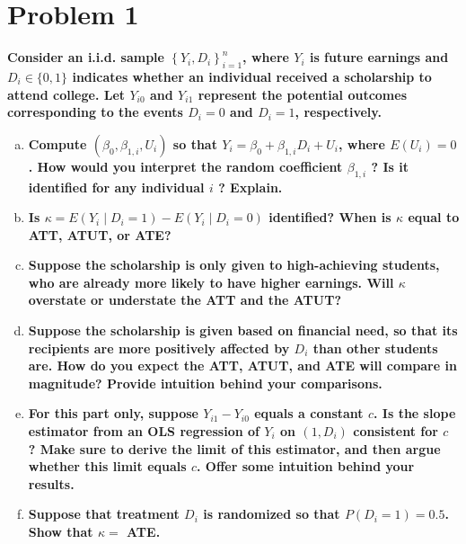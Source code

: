 \documentclass{article}
\begin{document}
\section*{Problem 1}
\textbf{Consider an i.i.d. sample $\left\{Y_{i}, D_{i}\right\}_{i=1}^{n}$, where $Y_{i}$ is future earnings and $D_{i} \in\{0,1\}$ indicates whether an individual received a scholarship to attend college. Let $Y_{i 0}$ and $Y_{i 1}$ represent the potential outcomes corresponding to the events $D_{i}=0$ and $D_{i}=1$, respectively.}

\begin{enumerate}[(a), wide, labelwidth=!, labelindent=0pt]
    \item \textbf{Compute $\left(\beta_{0}, \beta_{1, i}, U_{i}\right)$ so that $Y_{i}=\beta_{0}+\beta_{1, i} D_{i}+U_{i}$, where $E\left(U_{i}\right)=0$. How would you interpret the random coefficient $\beta_{1, i}$ ? Is it identified for any individual $i$ ? Explain.}
    
    \item \textbf{Is $\kappa=E\left(Y_{i} \mid D_{i}=1\right)-E\left(Y_{i} \mid D_{i}=0\right)$ identified? When is $\kappa$ equal to ATT, ATUT, or ATE?}
    
    \item \textbf{Suppose the scholarship is only given to high-achieving students, who are already more likely to have higher earnings. Will $\kappa$ overstate or understate the ATT and the ATUT?}
    
    \item \textbf{Suppose the scholarship is given based on financial need, so that its recipients are more positively affected by $D_{i}$ than other students are. How do you expect the ATT, ATUT, and ATE will compare in magnitude? Provide intuition behind your comparisons.}
    
    \item \textbf{For this part only, suppose $Y_{i 1}-Y_{i 0}$ equals a constant $c$. Is the slope estimator from an OLS regression of $Y_{i}$ on $\left(1, D_{i}\right)$ consistent for $c$ ? Make sure to derive the limit of this estimator, and then argue whether this limit equals $c$. Offer some intuition behind your results.}
    
    \item \textbf{Suppose that treatment $D_{i}$ is randomized so that $P\left(D_{i}=1\right)=0.5$. Show that $\kappa=$ ATE.}    
    
\end{enumerate}
\end{document}
